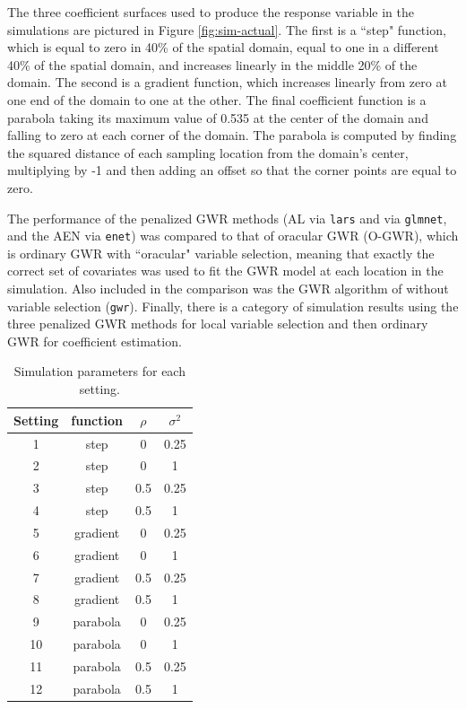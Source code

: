 \documentclass[authoryear, review, 11pt]{elsarticle}
\begin{document}
	The three coefficient surfaces used to produce the response variable in the simulations are pictured in Figure \ref{fig:sim-actual}. The first is a ``step" function, which is equal to zero in 40\% of the spatial domain, equal to one in a different 40\% of the spatial domain, and increases linearly in the middle 20\% of the domain. The second is a gradient function, which increases linearly from zero at one end of the domain to one at the other. The final coefficient function is a parabola taking its maximum value of 0.535 at the center of the domain and falling to zero at each corner of the domain. The parabola is computed by finding the squared distance of each sampling location from the domain's center, multiplying by -1 and then adding an offset so that the corner points are equal to zero.
	
	The performance of the penalized GWR methods (AL via {\tt lars} and via {\tt glmnet}, and the AEN  via {\tt enet}) was compared to that of oracular GWR (O-GWR), which is ordinary GWR with ``oracular" variable selection, meaning that exactly the correct set of covariates was used to fit the GWR model at each location in the simulation. Also included in the comparison was the GWR algorithm of \cite{Fotheringham:2002} without variable selection ({\tt gwr}). Finally, there is a category of simulation results using the three penalized GWR methods for local variable selection and then ordinary GWR for coefficient estimation.
	
\begin{table}[h!]
	\begin{center}
	\begin{tabular}{cccc}
		\hline
		Setting & function & $\rho$ & $\sigma^2$ \\ 
		\hline
		1 & step & 0 & 0.25 \\ 
		2 & step & 0 & 1 \\ 
		3 & step & 0.5 & 0.25 \\ 
		4 & step & 0.5 & 1 \\ 
		\hline
		5 & gradient & 0 & 0.25 \\ 
		6 & gradient & 0 & 1 \\ 
		7 & gradient & 0.5 & 0.25 \\ 
		8 & gradient & 0.5 & 1 \\ 
		\hline
		9 & parabola & 0 & 0.25 \\ 
		10 & parabola & 0 & 1 \\ 
		11 & parabola & 0.5 & 0.25 \\ 
		12 & parabola & 0.5 & 1 
	\end{tabular}
	\end{center}
	\caption{Simulation parameters for each setting.\label{table:simulation_settings}}
\end{table}
\end{document}
